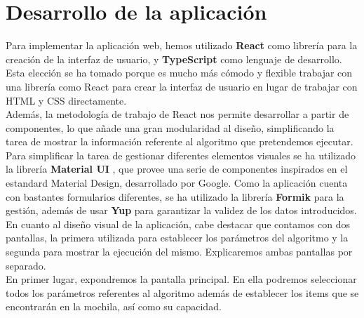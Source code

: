 \section{Desarrollo de la aplicación}

Para implementar la aplicación web, hemos utilizado \textbf{React} \cite{react} como librería para la creación de la interfaz de usuario, y \textbf{TypeScript} como lenguaje de desarrollo. Esta elección se ha tomado porque es mucho más cómodo y flexible trabajar con una librería como React para crear la interfaz de usuario en lugar de trabajar con HTML y CSS directamente. \\

Además, la metodología de trabajo de React nos permite desarrollar a partir de componentes, lo que añade una gran modularidad al diseño, simplificando la tarea de mostrar la información referente al algoritmo que pretendemos ejecutar. \\

Para simplificar la tarea de gestionar diferentes elementos visuales se ha utilizado la librería \textbf{Material UI} \cite{materialui}, que provee una serie de componentes inspirados en el estandard Material Design, desarrollado por Google. Como la aplicación cuenta con bastantes formularios diferentes, se ha utilizado la librería \textbf{Formik} \cite{formik} para la gestión, además de usar \textbf{Yup} \cite{yup} para garantizar la validez de los datos introducidos. \\

En cuanto al diseño visual de la aplicación, cabe destacar que contamos con dos pantallas, la primera utilizada para establecer los parámetros del algoritmo y la segunda para mostrar la ejecución del mismo. Explicaremos ambas pantallas por separado. \\

En primer lugar, expondremos la pantalla principal. En ella podremos seleccionar todos los parámetros referentes al algoritmo además de establecer los items que se encontrarán en la mochila, así como su capacidad. \\

